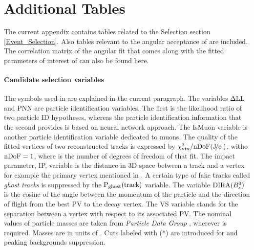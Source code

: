
\chapter{Additional Tables}
\label{AdditionalTables}

The current appendix contains tables related to the Selection section \ref{Event_Selection}.
Also tables relevant to the angular acceptance of  are included.
The correlation matrix of the angular fit that comes along with the fitted parameters
of interest of  can also be found here.

\subsubsection{Candidate selection variables}
The symbols used in  are explained in the current paragraph.
The variables $\rm \Delta LL$ and PNN are particle identification variables. The first is the
likelihood ratio of two particle ID hypotheses, whereas the particle identification information
that the second provides is based on neural network approach. The IsMuon variable is another
particle identification variable dedicated to muons. The quality of the fitted vertices
of two reconstructed tracks is expressed by $\chi^2_{\rm vtx}/\rm nDoF({J\mskip -3mu/\mskip -2mu\psi\mskip 2mu})$, witho $\rm nDoF=1$, where \nDoF
is the number of degrees of freedom of that fit. The impact parameter,
IP, variable is the distance in 3D space between a track and a vertex for example the primary vertex mentioned in .
A certain type of fake tracks called {\it ghost tracks} is suppressed by the $\text{P}_{\rm ghost}(\rm track)$
variable. The variable ${\rm DIRA}(B^0_s)$ is the cosine of the angle between the momentum of the \Bs particle
and the direction of flight from the best PV to the \Bs decay vertex. The VS variable stands for
the separation between a vertex with respect to its associated PV. The nominal values of particle
masses are taken from {\it Particle Data Group} \cite{PDG}, wherever is required. Masses are in units of \mevcc. Cuts labeled with (*) are introduced
for \LbJpsipK and \LbJpsippi peaking backgrounds suppression.


